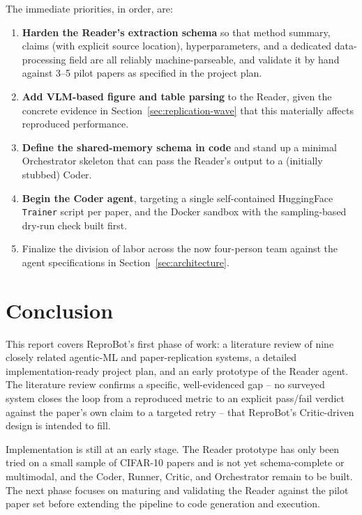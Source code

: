 \documentclass[11pt]{article}
\begin{document}
The immediate priorities, in order, are:
\begin{enumerate}
  \item \textbf{Harden the Reader's extraction schema} so that method summary, claims
  (with explicit source location), hyperparameters, and a dedicated data-processing
  field are all reliably machine-parseable, and validate it by hand against 3--5 pilot
  papers as specified in the project plan.
  \item \textbf{Add VLM-based figure and table parsing} to the Reader, given the
  concrete evidence in Section~\ref{sec:replication-wave} that this materially affects
  reproduced performance.
  \item \textbf{Define the shared-memory schema in code} and stand up a minimal
  Orchestrator skeleton that can pass the Reader's output to a (initially stubbed)
  Coder.
  \item \textbf{Begin the Coder agent}, targeting a single self-contained HuggingFace
  \texttt{Trainer} script per paper, and the Docker sandbox with the sampling-based
  dry-run check built first.
  \item Finalize the division of labor across the now four-person team against the
  agent specifications in Section~\ref{sec:architecture}.
\end{enumerate}

\section{Conclusion}
\label{sec:conclusion}

This report covers ReproBot's first phase of work: a literature review of nine closely
related agentic-ML and paper-replication systems, a detailed implementation-ready
project plan, and an early prototype of the Reader agent. The literature review confirms
a specific, well-evidenced gap -- no surveyed system closes the loop from a reproduced
metric to an explicit pass/fail verdict against the paper's own claim to a targeted
retry -- that ReproBot's Critic-driven design is intended to fill.

Implementation is still at an early stage. The Reader prototype has only been tried on a
small sample of CIFAR-10 papers and is not yet schema-complete or multimodal, and the
Coder, Runner, Critic, and Orchestrator remain to be built. The next phase focuses on
maturing and validating the Reader against the pilot paper set before extending the
pipeline to code generation and execution.
\end{document}
